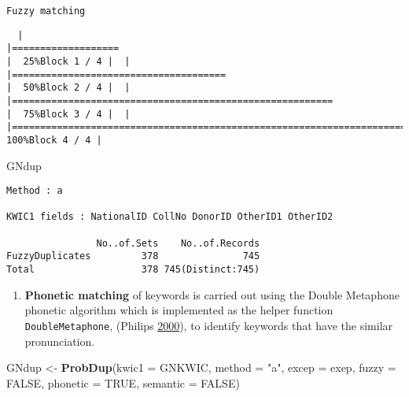 \documentclass[
]{article}
\newenvironment{Shaded}{\begin{snugshade}}{\end{snugshade}}
\newcommand{\DataTypeTok}[1]{\textcolor[rgb]{0.13,0.29,0.53}{#1}}
\newcommand{\KeywordTok}[1]{\textcolor[rgb]{0.13,0.29,0.53}{\textbf{#1}}}
\newcommand{\NormalTok}[1]{#1}
\newcommand{\OtherTok}[1]{\textcolor[rgb]{0.56,0.35,0.01}{#1}}
\newcommand{\StringTok}[1]{\textcolor[rgb]{0.31,0.60,0.02}{#1}}
\providecommand{\tightlist}{%
  \setlength{\itemsep}{0pt}\setlength{\parskip}{0pt}}
\begin{document}
\begin{verbatim}
Fuzzy matching
\end{verbatim}

\begin{verbatim}
  |                                                                                    |===================                                                         |  25%Block 1 / 4 |  |                                                                                    |======================================                                      |  50%Block 2 / 4 |  |                                                                                    |=========================================================                   |  75%Block 3 / 4 |  |                                                                                    |============================================================================| 100%Block 4 / 4 |
\end{verbatim}

\begin{Shaded}
\begin{Highlighting}[]
\NormalTok{GNdup}
\end{Highlighting}
\end{Shaded}

\begin{verbatim}
Method : a

KWIC1 fields : NationalID CollNo DonorID OtherID1 OtherID2
 
                No..of.Sets    No..of.Records
FuzzyDuplicates         378               745
Total                   378 745(Distinct:745)
\end{verbatim}

\begin{enumerate}
\def\labelenumi{\arabic{enumi}.}
\setcounter{enumi}{1}
\tightlist
\item
  \textbf{Phonetic matching} of keywords is carried out using the Double
  Metaphone phonetic algorithm which is implemented as the helper
  function \texttt{DoubleMetaphone}, (Philips
  \protect\hyperlink{ref-p00}{2000}), to identify keywords that have the
  similar pronunciation.
\end{enumerate}

\begin{Shaded}
\begin{Highlighting}[]
\NormalTok{GNdup <-}\StringTok{ }\KeywordTok{ProbDup}\NormalTok{(}\DataTypeTok{kwic1 =}\NormalTok{ GNKWIC, }\DataTypeTok{method =} \StringTok{"a"}\NormalTok{, }\DataTypeTok{excep =}\NormalTok{ exep, }
                 \DataTypeTok{fuzzy =} \OtherTok{FALSE}\NormalTok{,}
                 \DataTypeTok{phonetic =} \OtherTok{TRUE}\NormalTok{,}
                 \DataTypeTok{semantic =} \OtherTok{FALSE}\NormalTok{)}
\end{Highlighting}
\end{Shaded}
\end{document}
